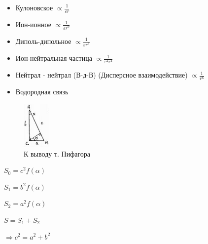 
\begin{lecture}
	\begin{lecSection}
	\begin{flushleft}	
		\begin{itemize}
			\item Кулоновское $\propto $\Large$\frac{1}{\varepsilon r}$ \normalsize	
			\item Ион-ионное $\propto $\Large$\frac{1}{\varepsilon r^2}$ \normalsize
			\item Диполь-дипольное $\propto$\Large$\frac{1}{\varepsilon r^3}$\normalsize
			\item Ион-нейтральная частица $\propto$\Large$\frac{1}{\varepsilon^2 r^4}$\normalsize
			\item Нейтрал - нейтрал (В-д-В) (Дисперсное взаимодействие) $\propto$\Large$\frac{1}{r^6}$\normalsize
			\item Водородная связь 
		\end{itemize}
	\end{flushleft}
	\end{lecSection}

	\begin{lecSection}

	\begin{figure}
    	\begin{center}
			\includegraphics[width=0.12\textwidth]{lecture_07/pic1}
     	\end{center}
     \caption{К выводу т. Пифагора}
	\end{figure}

	\par $S_0 = c^2 f(\alpha)$
	\par $S_1 = b^2 f(\alpha)$
	\par $S_2 = a^2 f(\alpha)$
	\par $S = S_1 + S_2$
	\par $\Rightarrow c^2 = a^2 + b^2$

	\end{lecSection}
	

\end{lecture}
